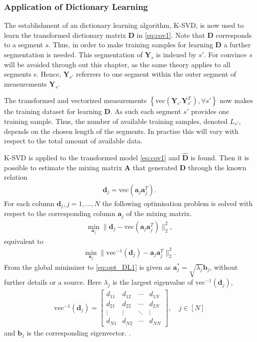 \subsubsection{Application of Dictionary Learning}
The establishment of an dictionary learning algorithm, K-SVD, is now used to learn the transformed dictionary matrix $\textbf{D}$ in \eqref{eq:cov1}. 
Note that $\textbf{D}$ corresponds to a segment $s$. Thus, in order to make training samples for learning $\textbf{D}$ a further segmentation is needed.
This segmentation of $\textbf{Y}_s$ is indexed by $s'$. For convince $s$ will be avoided through out this chapter, as the same theory applies to all segments s. Hence, $\textbf{Y}_{s'}$ referrers to one segment within the outer segment of measurements $\textbf{Y}_s$.
   
The transformed and vectorized measurements $\left\{ \text{vec}\left( \mathbf{Y}_{s'} \mathbf{Y}_{s'}^T \right), \forall s' \right\}$ now makes the training dataset for learning $\textbf{D}$. 
As such each segment $s'$ provides one training sample.   
Thus, the number of available training samples, denoted $L_{s'}$, depends on the chosen length of the segments. In practise this will vary with respect to the total amount of available data. 

K-SVD is applied to the transformed model \eqref{eq:cov1} and $\hat{\mathbf{D}}$ is found. Then it is possible to estimate the mixing matrix $\mathbf{A}$ that generated $\textbf{D}$ through the known relation 
\begin{align*}
\mathbf{d}_j = \text{vec}(\mathbf{a}_j \mathbf{a}_j^T).
\end{align*}
For each column $\textbf{d}_j, j=1,\hdots,N$ the following optimisation problem is solved with respect to the corresponding column $\textbf{a}_j$ of the mixing matrix.
\begin{align*}
\min_{\textbf{a}_j} \| \textbf{d}_j -\text{vec}\left(\textbf{a}_j\textbf{a}_j^T\right) \|_2^2, 
\end{align*}
equivalent to 
\begin{align}
\min_{\textbf{a}_j} \| \text{vec}^{-1}(\textbf{d}_j) -\textbf{a}_j\textbf{a}_j^T\|_2^2. \label{eq:opt_DL1}
\end{align}
From \cite{Balkan2015} the global minimizer to \eqref{eq:opt_DL1} is given as $\mathbf{a}^{\ast}_j=\sqrt{\lambda_j} \textbf{b}_j$, without further details or a source.  
Here $\lambda_j$ is the largest eigenvalue of $\text{vec}^{-1}(\textbf{d}_j)$,
\begin{align*}
\text{vec}^{-1}(\textbf{d}_j) = 
\begin{bmatrix}
d_{11} & d_{12} & \cdots & d_{1N} \\
d_{21} & d_{22} & \cdots & d_{2N} \\
\vdots & \vdots & \ddots & \vdots \\
d_{N1} & d_{N2} & \cdots & d_{NN}
\end{bmatrix}, \quad j \in [N]
\end{align*}
and $\textbf{b}_j$ is the corresponding eigenvector.
.

